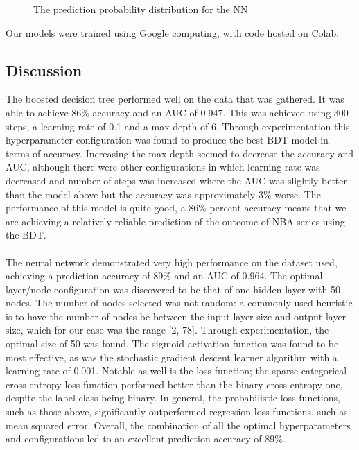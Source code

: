 \documentclass[letterpaper]{article} %
\begin{document}
\begin{figure}[!htb]
        \caption{\label{fig:nn_prediction_distribution} The prediction probability distribution for the NN}
\end{figure}

Our models were trained using Google computing, with code hosted on Colab. 

\subsection{Discussion}
The boosted decision tree performed well on the data that was gathered. It was able to achieve 86\% accuracy and an AUC of 0.947. This was achieved using 300 steps, a learning rate of 0.1 and a max depth of 6. Through experimentation this hyperparameter configuration was found to produce the best BDT model in terms of accuracy. Increasing the max depth seemed to decrease the accuracy and AUC, although there were other configurations in which learning rate was decreased and number of steps was increased where the AUC was slightly better than the model above but the accuracy was approximately 3\% worse. The performance of this model is quite good, a 86\% percent accuracy means that we are achieving a relatively reliable prediction of the outcome of NBA series using the BDT. \\ \\
The neural network demonstrated very high performance on the dataset used, achieving a prediction accuracy of 89\% and an AUC of 0.964. The optimal layer/node configuration was discovered to be that of one hidden layer with 50 nodes. The number of nodes selected was not random: a commonly used heuristic is to have the number of nodes be between the input layer size and output layer size, which for our case was the range [2, 78]. Through experimentation, the optimal size of 50 was found. The sigmoid activation function was found to be most effective, as was the stochastic gradient descent learner algorithm with a learning rate of 0.001. Notable as well is the loss function; the sparse categorical cross-entropy loss function performed better than the binary cross-entropy one, despite the label class being binary. In general, the probabilistic loss functions, such as those above, significantly outperformed regression loss functions, such as mean squared error. Overall, the combination of all the optimal hyperparameters and configurations led to an excellent prediction accuracy of 89\%. \\ \\
\end{document}
